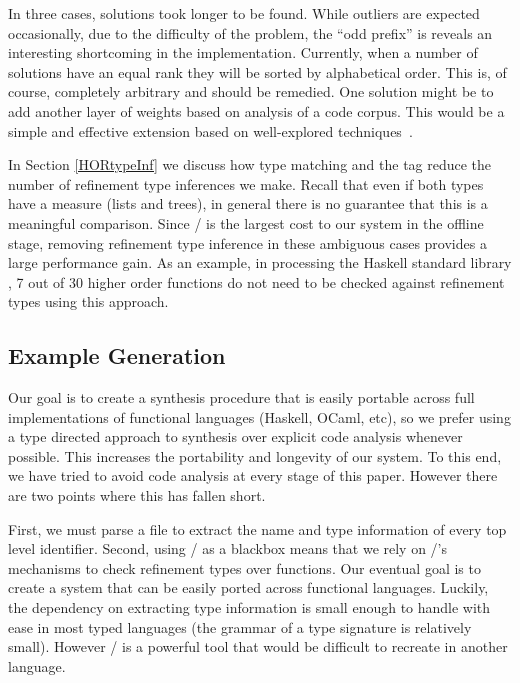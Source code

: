 In three cases, solutions took longer to be found. 
While outliers are expected occasionally, due to the difficulty of the problem, the ``odd prefix'' is reveals an interesting shortcoming in the implementation.
Currently, when a number of solutions have an equal rank they will be sorted by alphabetical order.
This is, of course, completely arbitrary and should be remedied.
One solution might be to add another layer of weights based on analysis of a code corpus. This would be a simple and effective extension based on well-explored techniques~\cite{thummalapenta2007parseweb}.

In Section \ref{HORtypeInf} we discuss how type matching and the  tag reduce the number of refinement type inferences we make. Recall that even if both types have a measure (lists and trees), in general there is no guarantee that this is a meaningful comparison. Since \lhask/ is the largest cost to our system in the offline stage, removing refinement type inference in these ambiguous cases provides a large performance gain. As an example, in processing the Haskell standard library , 7 out of 30 higher order functions do not need to be checked against refinement types using this approach.


\subsection{Example Generation}\label{languageSupport}


Our goal is to create a synthesis procedure that is easily portable across full implementations of functional languages (Haskell, OCaml, etc), so we prefer using a type directed approach to synthesis over explicit code analysis whenever possible.
This increases the portability and longevity of our system.
To this end, we have tried to avoid code analysis at every stage of this paper.
However there are two points where this has fallen short.

First, we must parse a file to extract the name and type information of every top level identifier.
Second, using \lhask/ as a blackbox means that we rely on \lhask/'s mechanisms to check refinement types over functions.
Our eventual goal is to create a system that can be easily ported across functional languages.
Luckily, the dependency on extracting type information is small enough to handle with ease in most typed languages (the grammar of a type signature is relatively small).
However \lhask/ is a powerful tool that would be difficult to recreate in another language.

